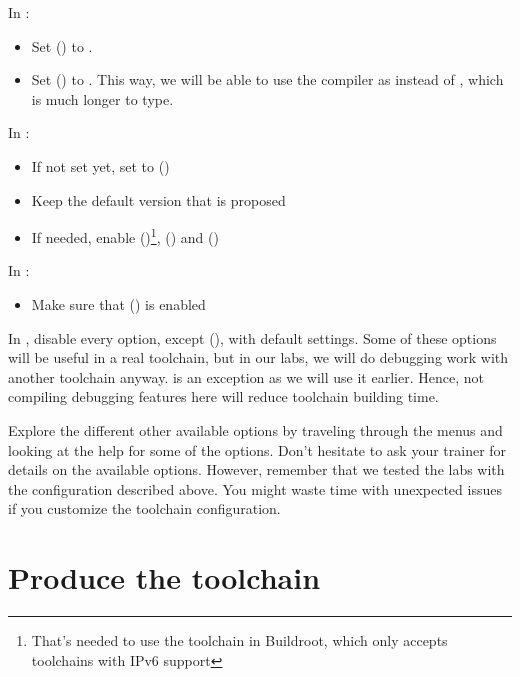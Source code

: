 In :
\begin{itemize}
\item Set  () to .
\item Set  () to .
      This way, we will be able to use the compiler as 
      instead of , which is
      much longer to type.
\end{itemize}

In :
\begin{itemize}
  \item If not set yet, set  to 
        ()
  \item Keep the default version that is proposed
  \item If needed, enable 
        ()\footnote{
        That's needed to use the toolchain in Buildroot, which only
        accepts toolchains with IPv6 support},
         () and
        ()
\end{itemize}

In :
\begin{itemize}
  \item Make sure that  () is enabled
\end{itemize}

In , disable every option, except 
(), with default settings.
Some of these options will be useful in a real
toolchain, but in our labs, we will do debugging work with another
toolchain anyway.  is an exception as we will use it earlier.
Hence, not compiling debugging features here will reduce toolchain building time.

Explore the different other available options by traveling through the
menus and looking at the help for some of the options. Don't hesitate
to ask your trainer for details on the available options. However,
remember that we tested the labs with the configuration described
above. You might waste time with unexpected issues if you customize the
toolchain configuration.

\section{Produce the toolchain}

